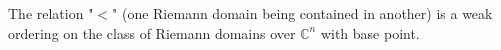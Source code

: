 The relation "$<$" (one Riemann domain being contained in another) is a weak ordering on the class of Riemann domains over $\mathbb{C}^n$ with base point.
